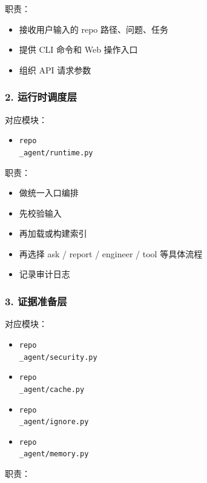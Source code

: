 \documentclass[UTF8,12pt,openany]{ctexbook}
\begin{document}
职责：\par

\begin{itemize}
\item 接收用户输入的 repo 路径、问题、任务
\item 提供 CLI 命令和 Web 操作入口
\item 组织 API 请求参数
\end{itemize}

\subsubsection{2. 运行时调度层}

对应模块：\par

\begin{itemize}
\item \texttt{repo\\_agent/runtime.py}
\end{itemize}

职责：\par

\begin{itemize}
\item 做统一入口编排
\item 先校验输入
\item 再加载或构建索引
\item 再选择 ask / report / engineer / tool 等具体流程
\item 记录审计日志
\end{itemize}

\subsubsection{3. 证据准备层}

对应模块：\par

\begin{itemize}
\item \texttt{repo\\_agent/security.py}
\item \texttt{repo\\_agent/cache.py}
\item \texttt{repo\\_agent/ignore.py}
\item \texttt{repo\\_agent/memory.py}
\end{itemize}

职责：\par
\end{document}
